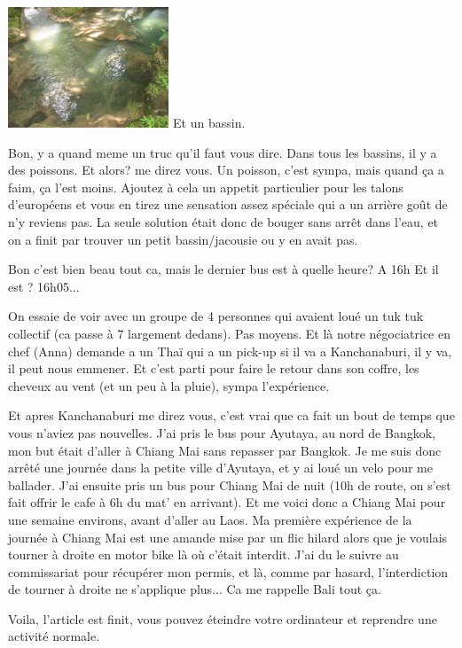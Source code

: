 \begin{multicols}{2}
\hspace*{-0.65cm}
\includegraphics[width=4.8cm]{articles/Kanchanaburi/1438.jpg}
Et un bassin.

Bon, y a quand meme un truc qu'il faut vous dire. Dans tous les bassins, il y a des poissons. Et alors? me direz vous. Un poisson, c'est sympa, mais quand ça a faim, ça l'est moins. Ajoutez à cela un appetit particulier pour les talons d'européens et vous en tirez une sensation assez spéciale qui a un arrière goût de n'y reviens pas. La seule solution était donc de bouger sans arrêt dans l'eau, et on a finit par trouver un petit bassin/jacousie ou y en avait pas.

\begin{dialogue}
   Bon c'est bien beau tout ca, mais le dernier bus est à quelle heure?
   A 16h
   Et il est ?
   16h05...
\end{dialogue}

On essaie de voir avec un groupe de 4 personnes qui avaient loué un tuk tuk collectif (ca passe à 7 largement dedans). Pas moyens. Et là notre négociatrice en chef (Anna) demande a un Thaï qui a un pick-up si il va a Kanchanaburi, il y va, il peut nous emmener. Et c'est parti pour faire le retour dans son coffre, les cheveux au vent (et un peu à la pluie), sympa l'expérience.

Et apres Kanchanaburi me direz vous, c'est vrai que ca fait un bout de temps que vous n'aviez pas nouvelles. J'ai pris le bus pour Ayutaya, au nord de Bangkok, mon but était d'aller à Chiang Mai sans repasser par Bangkok. Je me suis donc arrêté une journée dans la petite ville d'Ayutaya, et y ai loué un velo pour me ballader. J'ai ensuite pris un bus pour Chiang Mai de nuit (10h de route, on s'est fait offrir le cafe à 6h du mat' en arrivant). Et me voici donc a Chiang Mai pour une semaine environs, avant d'aller au Laos. Ma première expérience de la journée à Chiang Mai est une amande mise par un flic hilard alors que je voulais tourner à droite en motor bike là où c'était interdit. J'ai du le suivre au commissariat pour récupérer mon permis, et là, comme par hasard, l'interdiction de tourner à droite ne s'applique plus... Ca me rappelle Bali tout ça.

Voila, l'article est finit, vous pouvez éteindre votre ordinateur et reprendre une activité normale.

\end{multicols}


